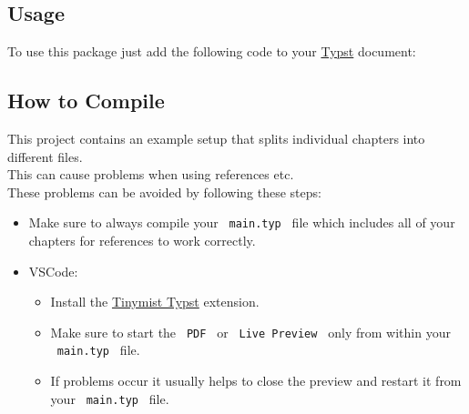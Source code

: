 \subsection{Usage}\label{usage}

To use this package just add the following code to your
\href{https://github.com/typst/typst}{Typst} document:

\begin{Shaded}
\begin{Highlighting}[]

\NormalTok{)}
\end{Highlighting}
\end{Shaded}

\subsection{How to Compile}\label{how-to-compile}

This project contains an example setup that splits individual chapters
into different files.\\
This can cause problems when using references etc.\\
These problems can be avoided by following these steps:

\begin{itemize}
\tightlist
\item
  Make sure to always compile your \texttt{\ main.typ\ } file which
  includes all of your chapters for references to work correctly.
\item
  VSCode:

  \begin{itemize}
  \tightlist
  \item
    Install the
    \href{https://marketplace.visualstudio.com/items?itemName=myriad-dreamin.tinymist}{Tinymist
    Typst} extension.
  \item
    Make sure to start the \texttt{\ PDF\ } or
    \texttt{\ Live\ Preview\ } only from within your
    \texttt{\ main.typ\ } file.
  \item
    If problems occur it usually helps to close the preview and restart
    it from your \texttt{\ main.typ\ } file.
  \end{itemize}
\end{itemize}

